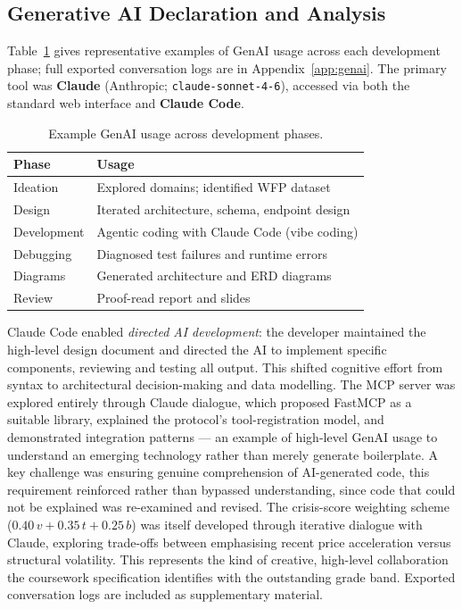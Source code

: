 \subsection{Generative AI Declaration and Analysis}

Table~\ref{tab:genai} gives representative examples of GenAI usage across each
development phase; full exported conversation logs are in Appendix~\ref{app:genai}.
The primary tool was \textbf{Claude} (Anthropic; \texttt{claude-sonnet-4-6}),
accessed via both the standard web interface and \textbf{Claude Code}.

\begin{table}[!htbp]
    \centering
    \small
    \begin{tabularx}{\linewidth}{lX}
        \toprule
        \textbf{Phase}  & \textbf{Usage}                                      \\
        \midrule
        Ideation        & Explored domains; identified WFP dataset            \\
        Design          & Iterated architecture, schema, endpoint design      \\
        Development     & Agentic coding with Claude Code (vibe coding)       \\
        Debugging       & Diagnosed test failures and runtime errors          \\
        Diagrams        & Generated architecture and ERD diagrams             \\
        Review          & Proof-read report and slides                        \\
        \bottomrule
    \end{tabularx}
    \caption{Example GenAI usage across development phases.}
    \label{tab:genai}
\end{table}

Claude Code enabled \textit{directed AI development}: the developer maintained the
high-level design document and directed the AI to implement specific components,
reviewing and testing all output.
This shifted cognitive effort from syntax to architectural decision-making and
data modelling.
The MCP server was explored entirely through Claude dialogue, which proposed FastMCP
as a suitable library, explained the protocol's tool-registration model, and
demonstrated integration patterns --- an example of high-level GenAI usage to
understand an emerging technology rather than merely generate boilerplate.
A key challenge was ensuring genuine comprehension of AI-generated code, this requirement reinforced rather than bypassed
understanding, since code that could not be explained was re-examined and revised.
The crisis-score weighting scheme ($0.40\,v + 0.35\,t + 0.25\,b$) was itself
developed through iterative dialogue with Claude, exploring trade-offs between
emphasising recent price acceleration versus structural volatility.
This represents the kind of creative, high-level collaboration the coursework
specification identifies with the outstanding grade band.
Exported conversation logs are included as supplementary material.

